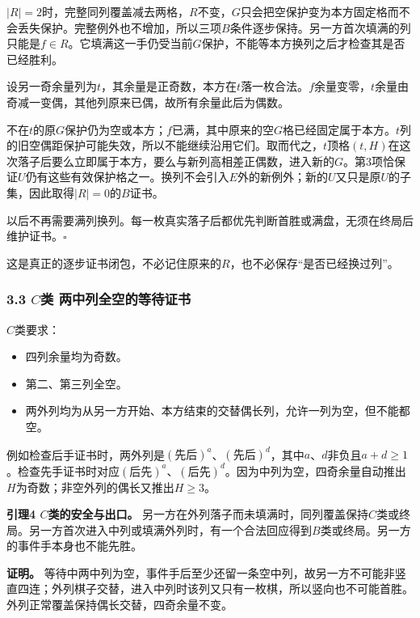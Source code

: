\documentclass[
  a4paper,
]{article}
\providecommand{\tightlist}{%
  \setlength{\itemsep}{0pt}\setlength{\parskip}{0pt}}
\begin{document}
\(|R|=2\)时，完整同列覆盖减去两格，\(R\)不变，\(G\)只会把空保护变为本方固定格而不会丢失保护。完整例外也不增加，所以三项\(B\)条件逐步保持。另一方首次填满的列只能是\(f\in R\)。它填满这一手仍受当前\(G\)保护，不能等本方换列之后才检查其是否已经胜利。

设另一奇余量列为\(t\)，其余量是正奇数，本方在\(t\)落一枚合法。\(f\)余量变零，\(t\)余量由奇减一变偶，其他列原来已偶，故所有余量此后为偶数。

不在\(t\)的原\(G\)保护仍为空或本方；\(f\)已满，其中原来的空\(G\)格已经固定属于本方。\(t\)列的旧空偶距保护可能失效，所以不能继续沿用它们。取而代之，\(t\)顶格\((t,H)\)在这次落子后要么立即属于本方，要么与新列高相差正偶数，进入新的\(G\)。第3项恰保证\(U\)仍有这些有效保护格之一。换列不会引入\(E\)外的新例外；新的\(U\)又只是原\(U\)的子集，因此取得\(|R|=0\)的\(B\)证书。

以后不再需要满列换列。每一枚真实落子后都优先判断首胜或满盘，无须在终局后维护证书。\(\square\)

这是真正的逐步证书闭包，不必记住原来的\(R\)，也不必保存``是否已经换过列''。

\subsubsection{\texorpdfstring{3.3 \(C\)类
两中列全空的等待证书}{3.3 C类 两中列全空的等待证书}}\label{cux7c7b-ux4e24ux4e2dux5217ux5168ux7a7aux7684ux7b49ux5f85ux8bc1ux4e66}

\(C\)类要求：

\begin{itemize}
\tightlist
\item
  四列余量均为奇数。
\item
  第二、第三列全空。
\item
  两外列均为从另一方开始、本方结束的交替偶长列，允许一列为空，但不能都空。
\end{itemize}

例如检查后手证书时，两外列是\((\text{先后})^a\)、\((\text{先后})^d\)，其中\(a\)、\(d\)非负且\(a+d\ge 1\)。检查先手证书时对应\((\text{后先})^a\)、\((\text{后先})^d\)。因为中列为空，四奇余量自动推出\(H\)为奇数；非空外列的偶长又推出\(H\ge 3\)。

\textbf{引理4 \(C\)类的安全与出口。}
另一方在外列落子而未填满时，同列覆盖保持\(C\)类或终局。另一方首次进入中列或填满外列时，有一个合法回应得到\(B\)类或终局。另一方的事件手本身也不能先胜。

\textbf{证明。}
等待中两中列为空，事件手后至少还留一条空中列，故另一方不可能非竖直四连；外列棋子交替，进入中列时该列又只有一枚棋，所以竖向也不可能首胜。外列正常覆盖保持偶长交替，四奇余量不变。
\end{document}
